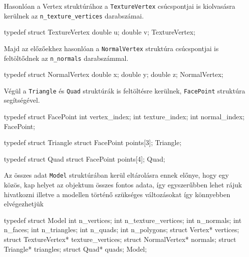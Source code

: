 Hasonlóan a Vertex struktúrához a \texttt{TextureVertex} csúcspontjai is kiolvasásra kerülnek az \texttt{n\_texture\_vertices} darabszámai.
\begin{python}
typedef struct TextureVertex
{
    double u;
    double v;
}TextureVertex;
\end{python}
\bigskip

Majd az előzőekhez hasonlóan a \texttt{NormalVertex}  struktúra csúcspontjai is feltöltődnek az \texttt{n\_normals} darabszámmal.
\begin{python}
typedef struct NormalVertex
{
    double x;
    double y;
    double z;
}NormalVertex;
\end{python}
\bigskip
\newpage
Végül a \texttt{Triangle} és \texttt{Quad} struktúrák is feltöltésre kerülnek, \texttt{FacePoint} struktúra segítségével.
\begin{python}
typedef struct FacePoint
{
    int vertex_index;
    int texture_index;
    int normal_index;
} FacePoint;

typedef struct Triangle
{
    struct FacePoint points[3];
} Triangle;

typedef struct Quad
{
    struct FacePoint points[4];
} Quad;
\end{python}
\bigskip

Az összes adat  \texttt{Model} struktúrában kerül eltárolásra ennek előnye, hogy egy közös, kap helyet az objektum összes fontos adata, így egyszerűbben lehet rájuk hivatkozni illetve a modellen történő szükséges változásokat  így könnyebben elvégezhetjük
\begin{python}
typedef struct Model
{
    int n_vertices;
    int n_texture_vertices;
    int n_normals;
    int n_faces;
    int n_triangles;
    int n_quads;
    int n_polygons;
    struct Vertex* vertices;
    struct TextureVertex* texture_vertices;
    struct NormalVertex* normals;
    struct Triangle* triangles;
    struct Quad* quads;
}Model;
\end{python}
\newpage
{}

